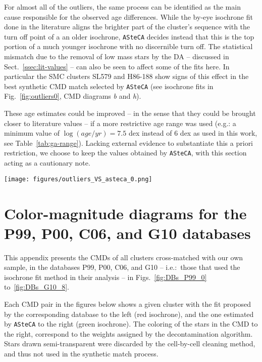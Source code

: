 \documentclass{aa}
\begin{document}
\begin{appendix}
For almost all of the outliers, the same process can be identified as the main
cause responsible for the observed age differences.
While the by-eye isochrone fit done in the literature aligns the brighter
part of the cluster's sequence with the turn off point of a an older
isochrone, \texttt{ASteCA} decides instead that this is the top portion of a
much younger isochrone with no discernible turn off.
%
The statistical mismatch due to the removal of low mass stars by the DA
-- discussed in Sect.~\ref{ssec:lit-values} -- can also be seen to affect some
of the fits here. In particular the SMC clusters SL579 and H86-188 show signs of
this effect in the best synthetic CMD match selected by \texttt{ASteCA}
(see isochrone fits in Fig.~\ref{fig:outliers0}, CMD diagrams \emph{b} and
\emph{h}).

These age estimates could be improved -- in the sense that they could
be brought closer to literature values -- if a more restrictive age range was
used (e.g.: a minimum value of $\log(age/yr){=}7.5$ dex instead of 6 dex as used
in this work, see Table~\ref{tab:ga-range}).
Lacking external evidence to substantiate this a priori restriction, we choose
to keep the values obtained by \texttt{ASteCA}, with this section acting as a
cautionary note.

\begin{figure*}
\texttt{[image: figures/outliers\_VS\_asteca\_0.png]}
\caption{CMDs for the outliers set. See description of the plots in the main
text of the section.}
\label{fig:outliers0}
\end{figure*}





\section{Color-magnitude diagrams for the P99, P00, C06, and G10 databases}
\label{apdx:databases}

This appendix presents the CMDs of all clusters cross-matched with our own
sample, in the databases P99, P00, C06, and G10 -- i.e.:\ those that used the
isochrone fit method in their analysis -- in Figs.~\ref{fig:DBs_P99_0}
to~\ref{fig:DBs_G10_8}.

Each CMD pair in the figures below shows a given cluster with the fit proposed
by the corresponding database to the left (red isochrone), and the one estimated
by \texttt{ASteCA} to the right (green isochrone).
The coloring of the stars in the CMD to the right, correspond to the weights
assigned by the decontamination algorithm. Stars drawn semi-transparent were
discarded by the cell-by-cell cleaning method, and thus not used in the
synthetic match process.


\end{appendix}
\end{document}

